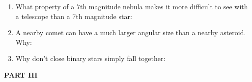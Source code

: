\documentclass[11pt]{article}
\begin{document}
\begin{enumerate}
\vspace{0.5cm} 
\item
What property of a 7th magnitude
nebula makes it more difficult to see with a telescope than a 
7th magnitude star: 
\makebox[3cm]{\hrulefill}

\vspace{0.5cm} 
\item
A nearby comet can have a much larger angular size than a nearby
asteroid. Why:  \makebox[3cm]{\hrulefill}


\vspace{0.5cm} 
\item
Why don't close binary stars simply fall together: \makebox[3cm]{\hrulefill} 

\end{enumerate}

\vspace{0.7cm} 
{\bf PART III}
\end{document}
